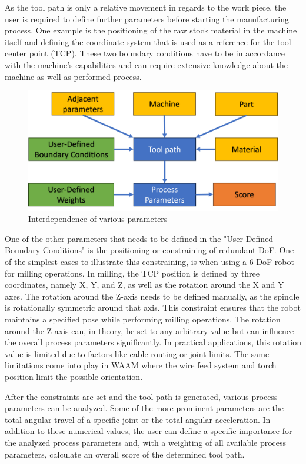 As the tool path is only a relative movement in regards to the work piece, the user is required to define further parameters before starting the manufacturing process. One example is the positioning of the raw stock material in the machine itself and defining the coordinate system that is used as a reference for the tool center point (TCP). These two boundary conditions have to be in accordance with the machine's capabilities and can require extensive knowledge about the machine as well as performed process.
\begin{figure}[H]
	\centerline{\includegraphics[scale=.6]{figures/BasicScore.png}}
	\caption{Interdependence of various parameters}
	\label{BasicScore}
\end{figure}

One of the other parameters that needs to be defined in the "User-Defined Boundary Conditions" is the positioning or constraining of redundant DoF. One of the simplest cases to illustrate this constraining, is when using a 6-DoF robot for milling operations. In milling, the TCP position is defined by three coordinates, namely X, Y, and Z, as well as the rotation around the X and Y axes. The rotation around the Z-axis needs to be defined manually, as the spindle is rotationally symmetric around that axis. This constraint ensures that the robot maintains a specified pose while performing milling operations. The rotation around the Z axis can, in theory, be set to any arbitrary value but can influence the overall process parameters significantly. In practical applications, this rotation value is limited due to factors like cable routing or joint limits. The same limitations come into play in WAAM where the wire feed system and torch position limit the possible orientation.

After the constraints are set and the tool path is generated, various process parameters can be analyzed. Some of the more prominent parameters are the total angular travel of a specific joint or the total angular acceleration. In addition to these numerical values, the user can define a specific importance for the analyzed process parameters and, with a weighting of all available process parameters, calculate an overall score of the determined tool path.

